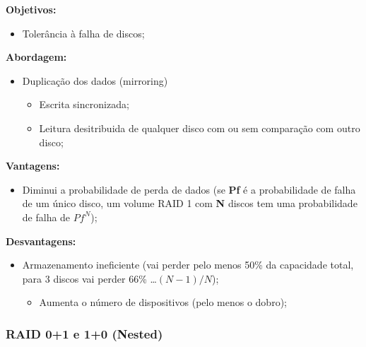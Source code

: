 \documentclass{article}
\begin{document}
\begin{flushleft}
  \textbf{Objetivos:}
  \begin{itemize}
    \item Tolerância à falha de discos;
  \end{itemize}

  \textbf{Abordagem:}
  \begin{itemize}
    \item Duplicação dos dados (mirroring)
    \begin{itemize}
      \item Escrita sincronizada;
      \item Leitura desitribuida de qualquer disco com ou sem
      comparação com outro disco;
    \end{itemize}
  \end{itemize}

  \textbf{Vantagens:}
  \begin{itemize}
    \item Diminui a probabilidade de perda de dados
    (se \textbf{Pf} é a probabilidade de falha de um único disco,
    um volume RAID 1 com \textbf{N} discos tem uma probabilidade
    de falha de $Pf^N$);
  \end{itemize}

  \textbf{Desvantagens:}
  \begin{itemize}
    \item Armazenamento ineficiente (vai perder pelo menos 50\%
    da capacidade total, para 3 discos vai perder 66\% \dots $(N-1)/N$);
    \begin{itemize}
      \item Aumenta o número de dispositivos (pelo menos o dobro);
    \end{itemize}
  \end{itemize}
\end{flushleft}

\pagebreak

\subsubsection{RAID 0+1 e 1+0 (Nested)}
\end{document}
